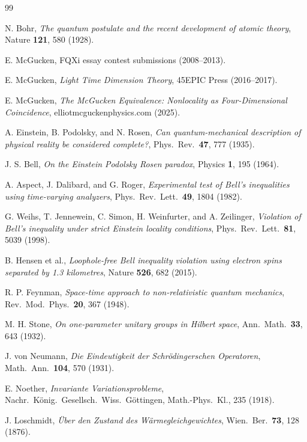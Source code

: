 \documentclass[11pt,a4paper]{article}
\begin{document}
\begin{thebibliography}{99}

 N. Bohr, \emph{The quantum postulate and the recent development of atomic theory}, Nature \textbf{121}, 580 (1928).

 E. McGucken, FQXi essay contest submissions (2008--2013).

 E. McGucken, \emph{Light Time Dimension Theory}, 45EPIC Press (2016--2017).

 E. McGucken, \emph{The McGucken Equivalence: Nonlocality as Four-Dimensional Coincidence}, elliotmcguckenphysics.com (2025).

 A. Einstein, B. Podolsky, and N. Rosen, \emph{Can quantum-mechanical description of physical reality be considered complete?}, Phys.\ Rev.\ \textbf{47}, 777 (1935).

 J. S. Bell, \emph{On the Einstein Podolsky Rosen paradox}, Physics \textbf{1}, 195 (1964).

 A. Aspect, J. Dalibard, and G. Roger, \emph{Experimental test of Bell's inequalities using time-varying analyzers}, Phys.\ Rev.\ Lett.\ \textbf{49}, 1804 (1982).

 G. Weihs, T. Jennewein, C. Simon, H. Weinfurter, and A. Zeilinger, \emph{Violation of Bell's inequality under strict Einstein locality conditions}, Phys.\ Rev.\ Lett.\ \textbf{81}, 5039 (1998).

 B. Hensen et al., \emph{Loophole-free Bell inequality violation using electron spins separated by 1.3 kilometres}, Nature \textbf{526}, 682 (2015).

 R. P. Feynman, \emph{Space-time approach to non-relativistic quantum mechanics}, Rev.\ Mod.\ Phys.\ \textbf{20}, 367 (1948).

 M. H. Stone, \emph{On one-parameter unitary groups in Hilbert space}, Ann.\ Math.\ \textbf{33}, 643 (1932).

 J. von Neumann, \emph{Die Eindeutigkeit der Schr\"odingerschen Operatoren}, Math.\ Ann.\ \textbf{104}, 570 (1931).

 E. Noether, \emph{Invariante Variationsprobleme}, Nachr.\ K\"onig.\ Gesellsch.\ Wiss.\ G\"ottingen, Math.-Phys.\ Kl., 235 (1918).

 J. Loschmidt, \emph{\"Uber den Zustand des W\"armegleichgewichtes}, Wien.\ Ber.\ \textbf{73}, 128 (1876).


\end{thebibliography}
\end{document}

